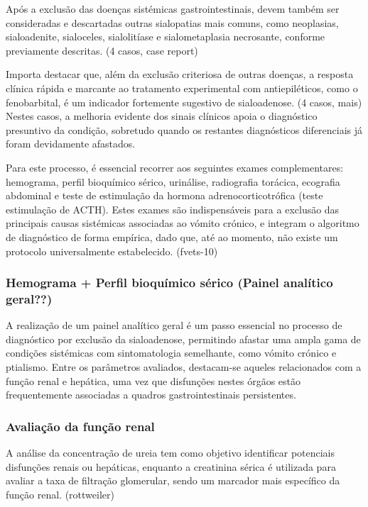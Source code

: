 Após a exclusão das doenças sistémicas gastrointestinais, devem também ser consideradas e descartadas outras sialopatias mais comuns, como neoplasias, sialoadenite, sialoceles, sialolitíase e sialometaplasia necrosante, conforme previamente descritas. (4 casos, case report) 


Importa destacar que, além da exclusão criteriosa de outras doenças, a resposta clínica rápida e marcante ao tratamento experimental com antiepiléticos, como o fenobarbital, é um indicador fortemente sugestivo de sialoadenose. (4 casos, mais) Nestes casos, a melhoria evidente dos sinais clínicos apoia o diagnóstico presuntivo da condição, sobretudo quando os restantes diagnósticos diferenciais já foram devidamente afastados.


Para este processo, é essencial recorrer aos seguintes exames complementares: hemograma, perfil bioquímico sérico, urinálise, radiografia torácica, ecografia abdominal e teste de estimulação da hormona adrenocorticotrófica (teste estimulação de ACTH). Estes exames são indispensáveis para a exclusão das principais causas sistémicas associadas ao vómito crónico, e integram o algoritmo de diagnóstico de forma empírica, dado que, até ao momento, não existe um protocolo universalmente estabelecido. (fvets-10)


\subsubsection{Hemograma + Perfil bioquímico sérico (Painel analítico geral??)}


A realização de um painel analítico geral é um passo essencial no processo de diagnóstico por exclusão da sialoadenose, permitindo afastar uma ampla gama de condições sistémicas com sintomatologia semelhante, como vómito crónico e ptialismo. Entre os parâmetros avaliados, destacam-se aqueles relacionados com a função renal e hepática, uma vez que disfunções nestes órgãos estão frequentemente associadas a quadros gastrointestinais persistentes.

\subsubsection{Avaliação da função renal}

A análise da concentração de ureia tem como objetivo identificar potenciais disfunções renais ou hepáticas, enquanto a creatinina sérica é utilizada para avaliar a taxa de filtração glomerular, sendo um marcador mais específico da função renal. (rottweiler) 


